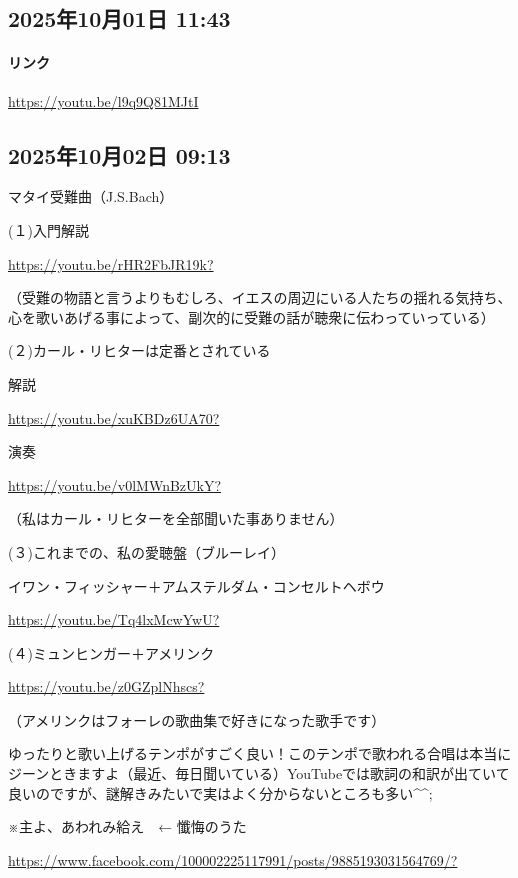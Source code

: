 \subsection*{2025年10月01日 11:43}

\paragraph{リンク}
\url{https://youtu.be/l9q9Q81MJtI}

\subsection*{2025年10月02日 09:13}

マタイ受難曲（J.S.Bach）

(１)入門解説

\url{https://youtu.be/rHR2FbJR19k?}

（受難の物語と言うよりもむしろ、イエスの周辺にいる人たちの揺れる気持ち、心を歌いあげる事によって、副次的に受難の話が聴衆に伝わっていっている）

(２)カール・リヒターは定番とされている

解説

\url{https://youtu.be/xuKBDz6UA70?}

演奏

\url{https://youtu.be/v0lMWnBzUkY?}

（私はカール・リヒターを全部聞いた事ありません）

(３)これまでの、私の愛聴盤（ブルーレイ）

イワン・フィッシャー＋アムステルダム・コンセルトヘボウ

\url{https://youtu.be/Tq4lxMcwYwU?}

(４)ミュンヒンガー＋アメリンク

\url{https://youtu.be/z0GZplNhscs?}

（アメリンクはフォーレの歌曲集で好きになった歌手です）

ゆったりと歌い上げるテンポがすごく良い！このテンポで歌われる合唱は本当にジーンときますよ（最近、毎日聞いている）YouTubeでは歌詞の和訳が出ていて良いのですが、謎解きみたいで実はよく分からないところも多い\textasciicircum{}\textasciicircum{};

※主よ、あわれみ給え　← 懺悔のうた

\url{https://www.facebook.com/100002225117991/posts/9885193031564769/?}


